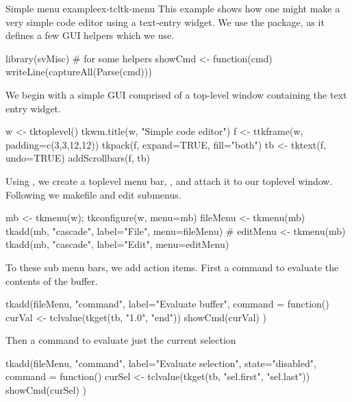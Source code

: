 \begin{example}{Simple menu example}{ex-tcltk-menu}
This example shows how one might make a very simple code editor using a text-entry widget. We use the  package, as it defines a few GUI helpers which we use.
\begin{Schunk}
\begin{Sinput}
 library(svMisc)                         # for some helpers
 showCmd <- function(cmd) writeLine(captureAll(Parse(cmd)))
\end{Sinput}
\end{Schunk}

We begin with a simple GUI comprised of a top-level window containing
the text entry widget.
\begin{Schunk}
\begin{Sinput}
 w <- tktoplevel()
 tkwm.title(w, "Simple code editor")
 f <- ttkframe(w, padding=c(3,3,12,12)) 
 tkpack(f, expand=TRUE, fill="both")
 tb <- tktext(f, undo=TRUE)
 addScrollbars(f, tb)
\end{Sinput}
\end{Schunk}
%

Using , we create a toplevel menu bar, , and
attach it to our toplevel window. Following we makefile and edit submenus.
\begin{Schunk}
\begin{Sinput}
 mb <- tkmenu(w); tkconfigure(w, menu=mb)
 fileMenu <- tkmenu(mb)
 tkadd(mb, "cascade", label="File", menu=fileMenu)
 #
 editMenu <- tkmenu(mb)
 tkadd(mb, "cascade", label="Edit", menu=editMenu)
\end{Sinput}
\end{Schunk}
%

To these sub menu bars, we add action items. First a command to
evaluate the contents of the buffer.
\begin{Schunk}
\begin{Sinput}
 tkadd(fileMenu, "command", label="Evaluate buffer",
       command = function() {
         curVal <- tclvalue(tkget(tb, "1.0", "end"))
         showCmd(curVal)
       })
\end{Sinput}
\end{Schunk}

Then a command to evaluate just the current selection
\begin{Schunk}
\begin{Sinput}
 tkadd(fileMenu, "command", label="Evaluate selection",
       state="disabled",
       command = function() {
         curSel <- tclvalue(tkget(tb, "sel.first", "sel.last"))
         showCmd(curSel)
       })
\end{Sinput}
\end{Schunk}


\end{example}
